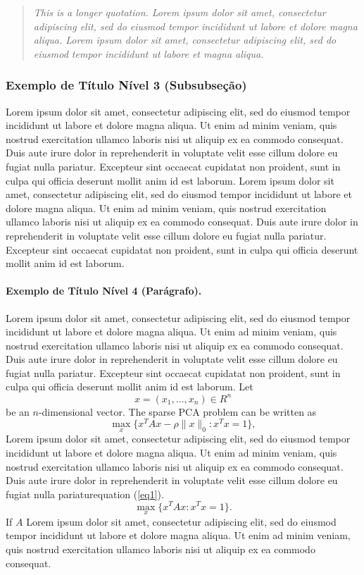 \documentclass[spanish]{sbc2025}%
\begin{document}
\begin{quotation}
\textit{This is a longer quotation. Lorem ipsum dolor sit amet, consectetur adipiscing elit, sed do eiusmod tempor incididunt ut labore et dolore magna aliqua. Lorem ipsum dolor sit amet, consectetur adipiscing elit, sed do eiusmod tempor incididunt ut labore et magna aliqua. 
}\end{quotation} 

\subsubsection{Exemplo de Título Nível 3 (Subsubseção)}

Lorem ipsum dolor sit amet, consectetur adipiscing elit, sed do eiusmod tempor incididunt ut labore et dolore magna aliqua. Ut enim ad minim veniam, quis nostrud exercitation ullamco laboris nisi ut aliquip ex ea commodo consequat. Duis aute irure dolor in reprehenderit in voluptate velit esse cillum dolore eu fugiat nulla pariatur. Excepteur sint occaecat cupidatat non proident, sunt in culpa qui officia deserunt mollit anim id est laborum. Lorem ipsum dolor sit amet, consectetur adipiscing elit, sed do eiusmod tempor incididunt ut labore et dolore magna aliqua. Ut enim ad minim veniam, quis nostrud exercitation ullamco laboris nisi ut aliquip ex ea commodo consequat. Duis aute irure dolor in reprehenderit in voluptate velit esse cillum dolore eu fugiat nulla pariatur. Excepteur sint occaecat cupidatat non proident, sunt in culpa qui officia deserunt mollit anim id est laborum.

\paragraph{Exemplo de Título Nível 4 (Parágrafo).}

Lorem ipsum dolor sit amet, consectetur adipiscing elit, sed do eiusmod tempor incididunt ut labore et dolore magna aliqua. Ut enim ad minim veniam, quis nostrud exercitation ullamco laboris nisi ut aliquip ex ea commodo consequat. Duis aute irure dolor in reprehenderit in voluptate velit esse cillum dolore eu fugiat nulla pariatur. Excepteur sint occaecat cupidatat non proident, sunt in culpa qui officia deserunt mollit anim id est laborum. 
Let
\[
x=(x_1,\dots,x_n)\in R^n
\]be an \(n\)-dimensional vector. The sparse PCA problem can be written as
\begin{equation}\label{eq1}
\max\limits_{x}\{x^TAx-\rho\|x\|_0:x^Tx=1\},
\end{equation}
Lorem ipsum dolor sit amet, consectetur adipiscing elit, sed do eiusmod tempor incididunt ut labore et dolore magna aliqua. Ut enim ad minim veniam, quis nostrud exercitation ullamco laboris nisi ut aliquip ex ea commodo consequat. Duis aute irure dolor in reprehenderit in voluptate velit esse cillum dolore eu fugiat nulla pariatur\break equation (\ref{eq1}). 
\[\max\limits_{x}\{x^TAx :x^Tx=1\}.\]
If $A$ Lorem ipsum dolor sit amet, consectetur adipiscing elit, sed do eiusmod tempor incididunt ut labore et dolore magna aliqua. Ut enim ad minim veniam, quis nostrud exercitation ullamco laboris nisi ut aliquip ex ea commodo consequat. 
\end{document}
